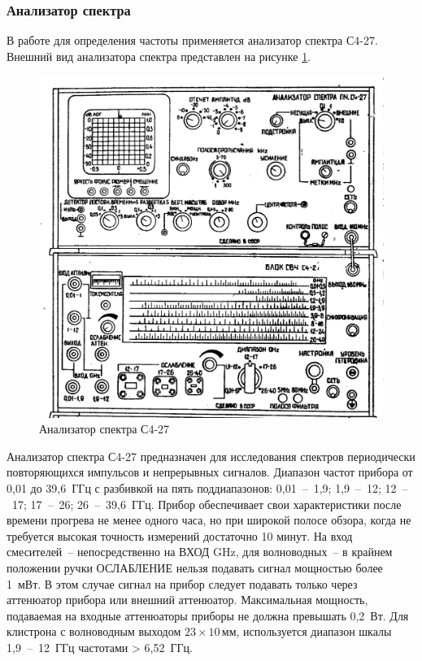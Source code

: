 \documentclass[a4paper,14pt]{extarticle}
\begin{document}
	\subsubsection{Анализатор спектра}
	
	В работе для определения частоты применяется анализатор спектра С4-27. Внешний вид анализатора спектра представлен на рисунке \ref{figa}.

    \begin{figure}[!h]
        \center
        \includegraphics[width = \textwidth]{images/s4-27.png}
        \caption{Анализатор спектра С4-27}
        \label{figa}
    \end{figure}

	Анализатор спектра С4-27 предназначен для исследования спектров периодически повторяющихся импульсов и непрерывных сигналов. Диапазон частот прибора от 0,01 до 39,6~ГГц с разбивкой на пять поддиапазонов: 0,01~--~1,9; 1,9~--~12; 12~--~17; 17~--~26; 26~--~39,6~ГГц. Прибор обеспечивает свои характеристики после времени прогрева не менее одного часа, но при широкой полосе обзора, когда не требуется высокая точность измерений достаточно 10 минут. На вход смесителей~-- непосредственно на ВХОД GHz, для волноводных~-- в крайнем положении ручки ОСЛАБЛЕНИЕ нельзя подавать сигнал мощностью более 1~мВт. В этом случае сигнал на прибор следует подавать только через аттенюатор прибора или внешний аттенюатор. Максимальная мощность, подаваемая на входные аттенюаторы приборы не должна превышать 0,2~Вт. Для клистрона с волноводным выходом $23\times10\,$мм, используется диапазон шкалы 1,9~--~12~ГГц частотами > 6,52~ГГц.  
	
\end{document}
